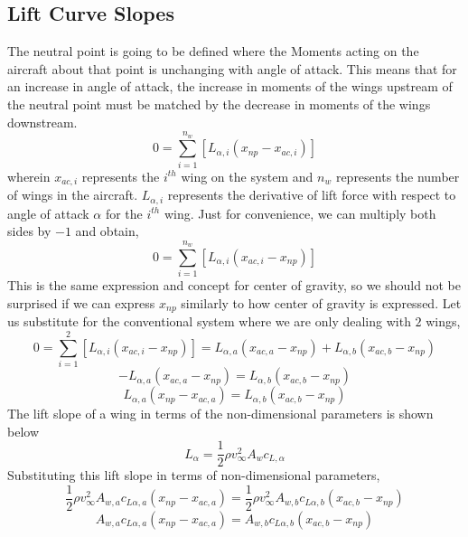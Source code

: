 \subsection{Lift Curve Slopes}
\begin{comment}
\end{comment}
The neutral point is going to be defined where the Moments acting on the aircraft about that point is unchanging with angle of attack. This means that for an increase in angle of attack, the increase in moments of the wings upstream of the neutral point must be matched by the decrease in moments of the wings downstream.
$$0 = \sum^{n_{w}}_{i = 1}\left[L_{\alpha,i}(x_{np}-x_{ac,i})\right]$$
wherein $x_{ac,i}$ represents the $i^{th}$ wing on the system and $n_{w}$ represents the number of wings in the aircraft. $L_{\alpha,i}$ represents the derivative of lift force with respect to angle of attack $\alpha$ for the $i^{th}$ wing. Just for convenience, we can multiply both sides by $-1$ and obtain,
$$0 = \sum^{n_{w}}_{i = 1}\left[L_{\alpha,i}(x_{ac,i}-x_{np})\right]$$
This is the same expression and concept for center of gravity, so we should not be surprised if we can express $x_{np}$ similarly to how center of gravity is expressed. Let us substitute for the conventional system where we are only dealing with $2$ wings,
$$0 = \sum^{2}_{i = 1}\left[L_{\alpha,i}(x_{ac,i}-x_{np})\right] = L_{\alpha,a}(x_{ac,a}-x_{np}) + L_{\alpha,b}(x_{ac,b}-x_{np})$$
$$-L_{\alpha,a}(x_{ac,a}-x_{np}) = L_{\alpha,b}(x_{ac,b}-x_{np})$$
$$L_{\alpha,a}(x_{np}-x_{ac,a}) = L_{\alpha,b}(x_{ac,b}-x_{np})$$
The lift slope of a wing in terms of the non-dimensional parameters is shown below
$$L_{\alpha} = \frac{1}{2}\rho v_{\infty}^{2} A_{w} c_{L,\alpha}$$
Substituting this lift slope in terms of non-dimensional parameters,
$$\frac{1}{2}\rho v_{\infty}^{2} A_{w,a} c_{L\alpha,a} (x_{np}-x_{ac,a}) = \frac{1}{2}\rho v_{\infty}^{2} A_{w,b} c_{L\alpha,b}(x_{ac,b}-x_{np})$$
\begin{equation}A_{w,a} c_{L\alpha,a} (x_{np}-x_{ac,a}) = A_{w,b} c_{L\alpha,b}(x_{ac,b}-x_{np}) \label{lift curve slope}\end{equation}

